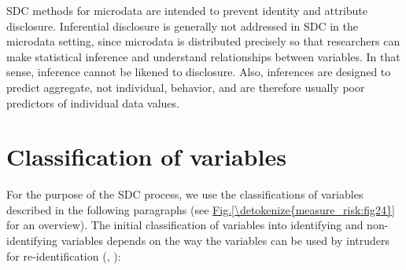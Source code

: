 \documentclass[letterpaper,10pt,english]{sphinxmanual}
\begin{document}
SDC methods for microdata are intended to prevent identity and attribute
disclosure. Inferential disclosure is generally not addressed in SDC in
the microdata setting, since microdata is distributed precisely so that
researchers can make statistical inference and understand relationships
between variables. In that sense, inference cannot be likened to
disclosure. Also, inferences are designed to predict aggregate, not
individual, behavior, and are therefore usually poor predictors of
individual data values.


\section{Classification of variables}
\label{\detokenize{measure_risk:classification-of-variables}}
For the purpose of the SDC process, we use the classifications of
variables described in the following paragraphs (see \hyperref[\detokenize{measure_risk:fig24}]{Fig.\@ \ref{\detokenize{measure_risk:fig24}}}
for an overview). The initial classification of variables into identifying and
non-identifying variables depends on the way the variables can be used
by intruders for re-identification ({\hyperref[\detokenize{measure_risk:hdfg12}]{}}, {\hyperref[\detokenize{measure_risk:temk14}]{}}):
\end{document}
